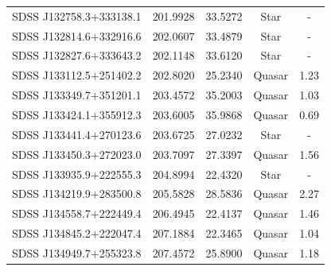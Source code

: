 \begin{longtable}{c c c c c}
SDSS J132758.3$+$333138.1 & 201.9928 & 33.5272 & Star & - \\
SDSS J132814.6$+$332916.6 & 202.0607 & 33.4879 & Star & - \\
SDSS J132827.6$+$333643.2 & 202.1148 & 33.6120 & Star & - \\
SDSS J133112.5$+$251402.2 & 202.8020 & 25.2340 & Quasar & 1.23 \\
SDSS J133349.7$+$351201.1 & 203.4572 & 35.2003 & Quasar & 1.03 \\
SDSS J133424.1$+$355912.3 & 203.6005 & 35.9868 & Quasar & 0.69 \\
SDSS J133441.4$+$270123.6 & 203.6725 & 27.0232 & Star & - \\
SDSS J133450.3$+$272023.0 & 203.7097 & 27.3397 & Quasar & 1.56 \\
SDSS J133935.9$+$222555.3 & 204.8994 & 22.4320 & Star & - \\
SDSS J134219.9$+$283500.8 & 205.5828 & 28.5836 & Quasar & 2.27 \\
SDSS J134558.7$+$222449.4 & 206.4945 & 22.4137 & Quasar & 1.46 \\
SDSS J134845.2$+$222047.4 & 207.1884 & 22.3465 & Quasar & 1.04 \\
SDSS J134949.7$+$255323.8 & 207.4572 & 25.8900 & Quasar & 1.18 \\

\end{longtable}